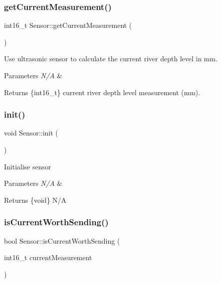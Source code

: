 \subsubsection{\texorpdfstring{get\+Current\+Measurement()}{getCurrentMeasurement()}}
{\footnotesize\ttfamily int16\+\_\+t Sensor\+::get\+Current\+Measurement (\begin{DoxyParamCaption}{ }\end{DoxyParamCaption})}

Use ultrasonic sensor to calculate the current river depth level in mm. 
\begin{DoxyParams}{Parameters}
{\em N/A} & \\
\hline
\end{DoxyParams}
\begin{DoxyReturn}{Returns}
\{int16\+\_\+t\} current river depth level measurement (mm). 
\end{DoxyReturn}
\mbox{\label{class_sensor_a84bc35cfba92eb579bc311b3c8b2980d}} 
\subsubsection{\texorpdfstring{init()}{init()}}
{\footnotesize\ttfamily void Sensor\+::init (\begin{DoxyParamCaption}{ }\end{DoxyParamCaption})}

Initialise sensor 
\begin{DoxyParams}{Parameters}
{\em N/A} & \\
\hline
\end{DoxyParams}
\begin{DoxyReturn}{Returns}
\{void\} N/A 
\end{DoxyReturn}
\mbox{\label{class_sensor_aa67cf318ae1bde8027b723d2c85e56dd}} 
\subsubsection{\texorpdfstring{is\+Current\+Worth\+Sending()}{isCurrentWorthSending()}}
{\footnotesize\ttfamily bool Sensor\+::is\+Current\+Worth\+Sending (\begin{DoxyParamCaption}\item[{int16\+\_\+t}]{current\+Measurement }\end{DoxyParamCaption})}

